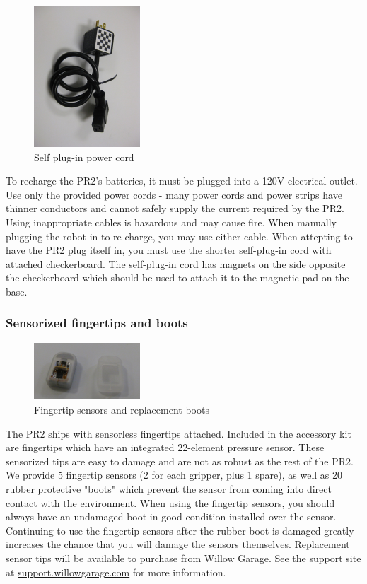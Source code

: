 \begin{figure}[h!]
\centering
\includegraphics[width=150px]{images/short_plug.png}
\caption{Self plug-in power cord}
\label{fig:shortcord}
\end{figure}
\label{shortcord}
To recharge the PR2's batteries, it
must be plugged into a 120V electrical outlet.  Use only the provided power
cords - many power cords and power strips have thinner conductors and cannot
safely supply the current required by the PR2.  Using inappropriate cables is
hazardous and may cause fire.  When manually plugging the robot in to re-charge, you
may use either cable.  When attepting to have the PR2 plug itself in, you must
use the shorter self-plug-in cord with attached checkerboard.  The self-plug-in
cord has magnets on the side opposite the checkerboard which should be used to
attach it to the magnetic pad on the base.

\subsubsection{Sensorized fingertips and boots}
\begin{figure}[h!]
\centering
\includegraphics[width=150px]{images/fingertips.png}
\caption{Fingertip sensors and replacement boots}
\label{fig:fingertips}
\end{figure}
\label{fingertips}


The PR2 ships with sensorless
fingertips attached.  Included in the accessory kit are fingertips which have an integrated
22-element pressure sensor. These sensorized tips are easy to damage and are not as robust as
the rest of the PR2.  We provide 5 fingertip sensors (2 for each gripper, plus 1
spare), as well as 20 rubber protective "boots" which prevent the sensor from
coming into direct contact with the environment.  When using the fingertip
sensors, you should always have an undamaged boot in good condition installed
over the sensor.  Continuing to use the fingertip sensors after the rubber boot
is damaged greatly increases the chance that you will damage the sensors
themselves.  Replacement sensor tips will be available to purchase from Willow Garage.  See the support site at \href{http://support.willowgarage.com}{support.willowgarage.com} for more information.

